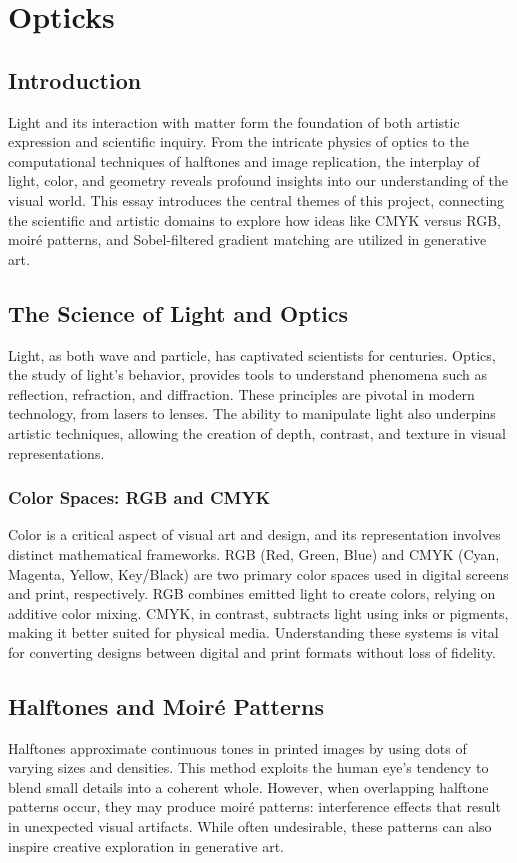 \chapter{Opticks}


\section*{Introduction}
Light and its interaction with matter form the foundation of both artistic expression and scientific inquiry. From the intricate physics of optics to the computational techniques of halftones and image replication, the interplay of light, color, and geometry reveals profound insights into our understanding of the visual world. This essay introduces the central themes of this project, connecting the scientific and artistic domains to explore how ideas like CMYK versus RGB, moir\'{e} patterns, and Sobel-filtered gradient matching are utilized in generative art.

\section*{The Science of Light and Optics}
Light, as both wave and particle, has captivated scientists for centuries. Optics, the study of light's behavior, provides tools to understand phenomena such as reflection, refraction, and diffraction. These principles are pivotal in modern technology, from lasers to lenses. The ability to manipulate light also underpins artistic techniques, allowing the creation of depth, contrast, and texture in visual representations.

\subsection*{Color Spaces: RGB and CMYK}
Color is a critical aspect of visual art and design, and its representation involves distinct mathematical frameworks. RGB (Red, Green, Blue) and CMYK (Cyan, Magenta, Yellow, Key/Black) are two primary color spaces used in digital screens and print, respectively. RGB combines emitted light to create colors, relying on additive color mixing. CMYK, in contrast, subtracts light using inks or pigments, making it better suited for physical media. Understanding these systems is vital for converting designs between digital and print formats without loss of fidelity.

\section*{Halftones and Moir\'{e} Patterns}
Halftones approximate continuous tones in printed images by using dots of varying sizes and densities. This method exploits the human eye's tendency to blend small details into a coherent whole. However, when overlapping halftone patterns occur, they may produce moir\'{e} patterns: interference effects that result in unexpected visual artifacts. While often undesirable, these patterns can also inspire creative exploration in generative art.

